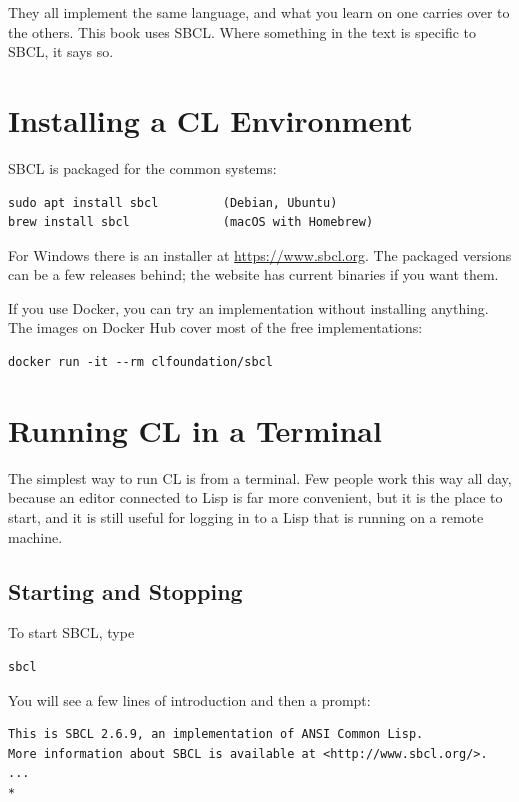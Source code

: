 They all implement the same language, and what you learn on one
carries over to the others. This book uses SBCL. Where something in
the text is specific to SBCL, it says so.

\section{Installing a CL Environment}

SBCL is packaged for the common systems:

\begin{verbatim}
sudo apt install sbcl         (Debian, Ubuntu)
brew install sbcl             (macOS with Homebrew)
\end{verbatim}

\noindent
For Windows there is an installer at \url{https://www.sbcl.org}. The
packaged versions can be a few releases behind; the website has
current binaries if you want them.

If you use Docker, you can try an implementation without installing
anything. The  images on Docker Hub cover most of
the free implementations:

\begin{verbatim}
docker run -it --rm clfoundation/sbcl
\end{verbatim}

\section{Running CL in a Terminal}

The simplest way to run CL is from a terminal. Few people work this
way all day, because an editor connected to Lisp is far more
convenient, but it is the place to start, and it is still useful for
logging in to a Lisp that is running on a remote machine.

\subsection{Starting and Stopping}

To start SBCL, type

\begin{verbatim}
sbcl
\end{verbatim}

\noindent
You will see a few lines of introduction and then a prompt:

\begin{verbatim}
This is SBCL 2.6.9, an implementation of ANSI Common Lisp.
More information about SBCL is available at <http://www.sbcl.org/>.
...
*
\end{verbatim}

